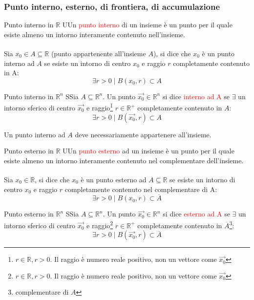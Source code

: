 \documentclass{article}  %
\begin{document}
\subsubsection{Punto interno, esterno, di frontiera, di accumulazione}
\begin{definition}{Punto interno in $\mathbb{R}$}
	UUn \textcolor{red}{punto interno} di un insieme è un punto per il quale esiste almeno un intorno interamente contenuto nell'insieme. \\ \\
	Sia $x_0 \in A \subseteq \mathbb{R}$ (punto appartenente all'insieme $A$), si dice che $x_0$ è un punto interno ad $A$ se esiste un intorno di centro $x_0$ e raggio $r$
	completamente contenuto in A:
	\[
		\exists r>0 \mid B(x_0,r) \subset A
	\]
\end{definition}
\begin{definition}{Punto interno in $\mathbb{R}^n$}
	SSia $A \subseteq \mathbb{R}^n$. Un punto $\vec{x_0} \in \mathbb{R}^n$ si dice \textcolor{red}{interno ad A} se $\exists$ un intorno sferico di centro $\vec{x_0}$ e
	raggio\footnote{$r \in \mathbb{R}, r > 0$. Il raggio è numero reale positivo, non un vettore come $\vec{x_0}$} $r \in \mathbb{R}^+$ completamente contenuto in $A$:
	\[
		\exists r>0 \mid B(\vec{x_0},r) \subset A
	\]
\end{definition}
Un punto interno ad $A$ deve necessariamente appartenere all'insieme.
\begin{definition}{Punto esterno in $\mathbb{R}$}
	UUn \textcolor{red}{punto esterno} ad un insieme è un punto per il quale esiste almeno un intorno interamente contenuto nel complementare dell'insieme. \\ \\
	Sia $x_0 \in \mathbb{R}$, si dice che $x_0$ è un punto esterno ad $A \subseteq \mathbb{R}$ se esiste un intorno di centro $x_0$ e raggio $r$
	completamente contenuto nel complementare di A:
	\[
		\exists r>0 \mid B(x_0,r) \subset \overline{A}
	\]
\end{definition}
\begin{definition}{Punto esterno in $\mathbb{R}^n$}
	SSia $A \subseteq \mathbb{R}^n$. Un punto $\vec{x_0} \in \mathbb{R}^n$ si dice \textcolor{red}{esterno ad A} se $\exists$ un intorno sferico di centro $\vec{x_0}$ e
	raggio\footnote{$r \in \mathbb{R}, r > 0$. Il raggio è numero reale positivo, non un vettore come $\vec{x_0}$} $r \in \mathbb{R}^+$ completamente contenuto in $\overline{A}$\footnote{complementare di $A$}:
	\[
		\exists r>0 \mid B(\vec{x_0},r) \subset \overline{A}
	\]
\end{definition}
\end{document}
